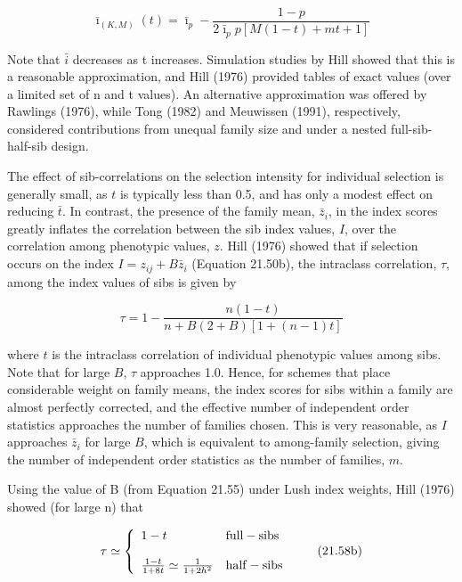 \documentclass{article}
\begin{document}
\begin{equation}
\bar{\imath}_{(K,M)}(t)=\bar{\imath}_{p}-\frac{1-p}{2\bar{\imath}_{p}p[M(1-t)+m t+1]}
\tag{21.57b}
\label{eq:21_57b}
\end{equation}

Note that  $ \bar{i} $ decreases as t increases. Simulation studies by Hill showed that this is a reasonable approximation, and Hill (1976) provided tables of exact values (over a limited set of n and t values). An alternative approximation was offered by Rawlings (1976), while Tong (1982) and Meuwissen (1991), respectively, considered contributions from unequal family size and under a nested full-sib-half-sib design.

The effect of sib-correlations on the selection intensity for individual selection is generally small, as $t$ is typically less than 0.5, and has only a modest effect on reducing $\bar{t}$. In contrast, the presence of the family mean, $\bar{z}_i$, in the index scores greatly inflates the correlation between the sib index values, $I$, over the correlation among phenotypic values, $z$. Hill (1976) showed that if selection occurs on the index $I = z_{ij} + B \bar{z}_i$ (Equation 21.50b), the intraclass correlation, $\tau$, among the index values of sibs is given by

\begin{equation}
\tau=1-\frac{n\left(1-t\right)}{n+B(2+B)[1+(n-1)t]}
\tag{21.58a}
\label{eq:21_58a}
\end{equation}

where $t$ is the intraclass correlation of individual phenotypic values among sibs. Note that for large $B$, $\tau$ approaches 1.0. Hence, for schemes that place considerable weight on family means, the index scores for sibs within a family are almost perfectly corrected, and the effective number of independent order statistics approaches the number of families chosen. This is very reasonable, as $I$ approaches $\bar{z}_{i}$ for large $B$, which is equivalent to among-family selection, giving the number of independent order statistics as the number of families, $m$.

Using the value of B (from Equation 21.55) under Lush index weights, Hill (1976) showed (for large n) that

\begin{equation}
\tau\simeq\left\{\begin{array}{l l}{1-t}&{\mathrm{f u l l-s i b s}}\\ {}&{}\\ {\frac{1-t}{1+8t}\simeq\frac{1}{1+2h^{2}}}&{\mathrm{h a l f-s i b s}}\\ \end{array}\right.
\tag{21.58b}
\label{eq:21_58b}
\end{equation}
\end{document}
